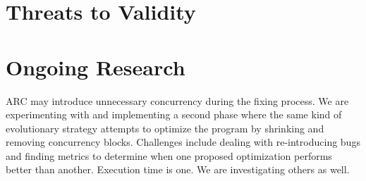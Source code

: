 \documentclass{llncs}
\begin{document}
\section{Threats to Validity}
\label{sec:threats}



\section{Ongoing Research}
\label{sec:ongoing}

ARC may introduce unnecessary concurrency during the fixing process.
We are experimenting with and implementing a second phase where the
same kind of evolutionary strategy attempts to optimize the program by
shrinking and removing concurrency blocks.  Challenges include
dealing with re-introducing bugs and finding metrics to determine when
one proposed optimization performs better than another.  Execution time is
one.  We are investigating others as well.

\end{document}
